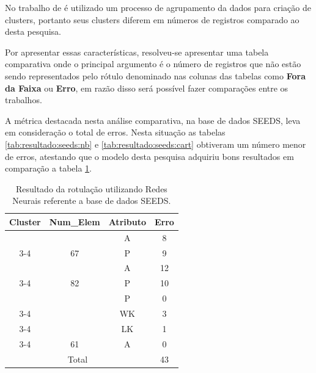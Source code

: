 No trabalho de  é utilizado um processo de agrupamento da dados para criação de clusters, portanto seus clusters diferem em números de registros comparado ao desta pesquisa. 


Por apresentar essas características, resolveu-se apresentar uma tabela comparativa onde o principal argumento é o número de registros que não estão sendo representados pelo rótulo denominado nas colunas das tabelas como \textbf{Fora da Faixa} ou \textbf{Erro}, em razão disso  será possível fazer comparações entre os trabalhos.

% 

A métrica destacada nesta análise comparativa, na base de dados SEEDS, leva em consideração o total de erros. Nesta situação as tabelas \ref{tab:resultado:seeds:nb} e \ref{tab:resultado:seeds:cart} obtiveram um número menor de erros, atestando que o modelo desta pesquisa adquiriu bons resultados em comparação a tabela \ref{tab:resultado:seeds:rn}.


\begin{table}[]
\centering
\caption{Resultado da rotulação utilizando Redes Neurais \cite{LOPES2014}  referente a base de dados SEEDS.}
\label{tab:resultado:seeds:rn}
\begin{tabular}{|c|c|c|c|}
\hline
\rowcolor[HTML]{EFEFEF} 
Cluster             & Num\_Elem             & Atributo & Erro \\ \hline
                    &                      & A        & 8    \\ \cline{3-4} 
\multirow{-2}{*}{1} & \multirow{-2}{*}{67} & P        & 9    \\ \hline
                    &                      & A        & 12   \\ \cline{3-4} 
\multirow{-2}{*}{2} & \multirow{-2}{*}{82} & P        & 10   \\ \hline
                    &                      & P        & 0    \\ \cline{3-4} 
                    &                      & WK       & 3    \\ \cline{3-4} 
                    &                      & LK       & 1    \\ \cline{3-4} 
\multirow{-4}{*}{3} & \multirow{-4}{*}{61} & A        & 0    \\ \hline
\multicolumn{3}{|c|}{Total}                           & 43   \\ \hline
\end{tabular}
\end{table}

